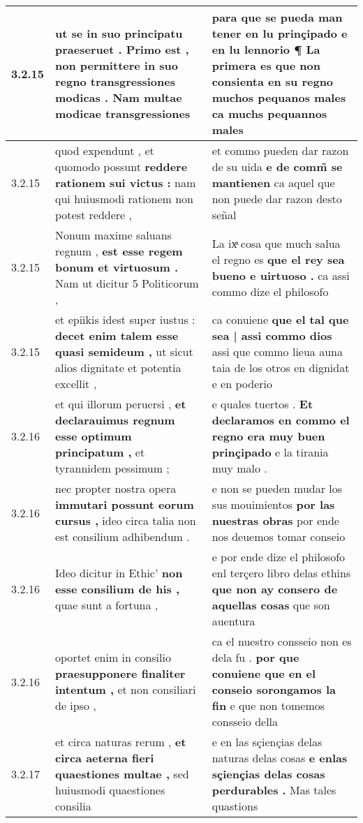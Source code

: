 \begin{tabular}{|p{1cm}|p{6.5cm}|p{6.5cm}|}
3.2.15 & ut se in suo principatu praeseruet . \textbf{ Primo est , non permittere in suo regno transgressiones modicas . } Nam multae modicae transgressiones & para que se pueda man tener en lu prinçipado e en lu lennorio ¶ \textbf{ La primera es que non consienta en su regno muchos pequanos males } ca muchs pequannos males \\\hline
3.2.15 & quod expendunt , et quomodo possunt \textbf{ reddere rationem sui victus : } nam qui huiusmodi rationem non potest reddere , & et commo pueden dar razon de su uida \textbf{ e de comm̃ se mantienen } ca aquel que non puede dar razon desto señal \\\hline
3.2.15 & Nonum maxime saluans regnum , \textbf{ est esse regem bonum et virtuosum . } Nam ut dicitur 5 Politicorum , & La ixͣ cosa que much salua el regno es \textbf{ que el rey sea bueno e uirtuoso . } ca assi commo dize el philosofo \\\hline
3.2.15 & et epiikis idest super iustus : \textbf{ decet enim talem esse quasi semideum , } ut sicut alios dignitate et potentia excellit , & ca conuiene \textbf{ que el tal que sea | assi commo dios } assi que commo lieua auna taia de los otros en dignidat e en poderio \\\hline
3.2.16 & et qui illorum peruersi , \textbf{ et declarauimus regnum esse optimum principatum , } et tyrannidem pessimum ; & e quales tuertos . \textbf{ Et declaramos en commo el regno era muy buen prinçipado } e la tirania muy malo . \\\hline
3.2.16 & nec propter nostra opera \textbf{ immutari possunt eorum cursus , } ideo circa talia non est consilium adhibendum . & e non se pueden mudar los sus mouimientos \textbf{ por las nuestras obras } por ende nos deuemos tomar conseio \\\hline
3.2.16 & Ideo dicitur in Ethic’ \textbf{ non esse consilium de his , } quae sunt a fortuna , & e por ende dize el philosofo enl terçero libro delas ethins \textbf{ que non ay consero de aquellas cosas } que son auentura \\\hline
3.2.16 & oportet enim in consilio \textbf{ praesupponere finaliter intentum , } et non consiliari de ipso , & ca el nuestro consseio non es dela fu . \textbf{ por que conuiene que en el conseio sorongamos la fin } e que non tomemos consseio della \\\hline
3.2.17 & et circa naturas rerum , \textbf{ et circa aeterna fieri quaestiones multae , } sed huiusmodi quaestiones consilia & e en las sçiençias delas naturas delas cosas \textbf{ e enlas sçiençias delas cosas perdurables . } Mas tales quastions \\\hline

\end{tabular}
